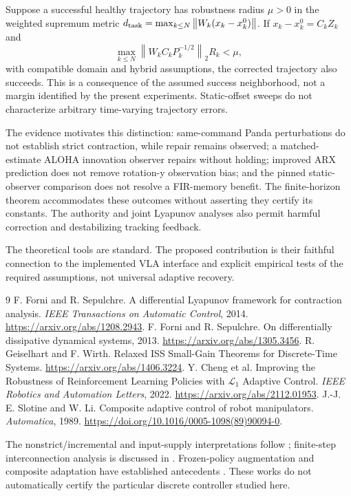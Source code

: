 \documentclass[11pt]{article}
\newcommand{\norm}[1]{\left\lVert#1\right\rVert}
\begin{document}
Suppose a successful healthy trajectory has robustness radius $\mu>0$ in
the weighted supremum metric
$d_{\rm task}=\max_{k\le N}\norm{W_k(x_k-x_k^0)}$.
If $x_k-x_k^0=C_kZ_k$ and
\begin{equation}
\max_{k\le N}\norm{W_kC_kP_k^{-1/2}}_2R_k<\mu,
\end{equation}
with compatible domain and hybrid assumptions, the corrected trajectory
also succeeds. This is a consequence of the assumed success neighborhood,
not a margin identified by the present experiments. Static-offset sweeps
do not characterize arbitrary time-varying trajectory errors.

The evidence motivates this distinction: same-command Panda perturbations
do not establish strict contraction, while repair remains observed; a
matched-estimate ALOHA innovation observer repairs without holding;
improved ARX prediction does not remove rotation-y observation bias; and
the pinned static-observer comparison does not resolve a FIR-memory benefit.
The finite-horizon theorem accommodates these outcomes without asserting
they certify its constants. The authority and joint Lyapunov analyses also
permit harmful correction and destabilizing tracking feedback.

The theoretical tools are standard. The proposed contribution is their
faithful connection to the implemented VLA interface and explicit empirical
tests of the required assumptions, not universal adaptive recovery.

\begin{thebibliography}{9}
F. Forni and R. Sepulchre.
A differential Lyapunov framework for contraction analysis.
\emph{IEEE Transactions on Automatic Control}, 2014.
\url{https://arxiv.org/abs/1208.2943}.
F. Forni and R. Sepulchre.
On differentially dissipative dynamical systems, 2013.
\url{https://arxiv.org/abs/1305.3456}.
R. Geiselhart and F. Wirth.
Relaxed ISS Small-Gain Theorems for Discrete-Time Systems.
\url{https://arxiv.org/abs/1406.3224}.
Y. Cheng et al.
Improving the Robustness of Reinforcement Learning Policies with
$\mathcal L_1$ Adaptive Control.
\emph{IEEE Robotics and Automation Letters}, 2022.
\url{https://arxiv.org/abs/2112.01953}.
J.-J. E. Slotine and W. Li.
Composite adaptive control of robot manipulators.
\emph{Automatica}, 1989.
\url{https://doi.org/10.1016/0005-1098(89)90094-0}.
\end{thebibliography}
The nonstrict/incremental and input-supply interpretations follow
\cite{forni2014,forni2013}; finite-step interconnection analysis is discussed
in \cite{geiselhart}. Frozen-policy augmentation and composite adaptation
have established antecedents \cite{cheng,slotine}. These works do not
automatically certify the particular discrete controller studied here.
\end{document}

